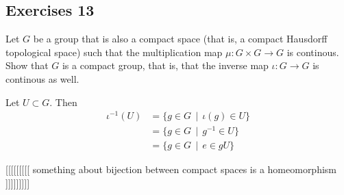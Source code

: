 \documentclass[11pt, english]{article}
\begin{document}
\subsection{Exercises 13}

\begin{exc}[Exercise 1]

Let $G$ be a group that is also a compact space (that is, a compact Hausdorff topological space) such that the multiplication map $\mu:G \times G \to G$ is continous. Show that $G$ is a compact group, that is, that the inverse map $\iota:G \to G$ is continous as well.
\end{exc}

\begin{sol}
 Let $U \subset G$. Then
 \begin{align*}
   \iota^{-1}(U) &= \{ g \in G \, \mid \, \iota(g) \in U \} \\
&= \{ g \in G \, \mid \, g^{-1} \in U \}  \\
&= \{ g \in G \, \mid \, e \in gU \}
 \end{align*}

[[[[[[[[[ something about bijection between compact spaces is a homeomorphism ]]]]]]]]]
\end{sol}
\end{document}
